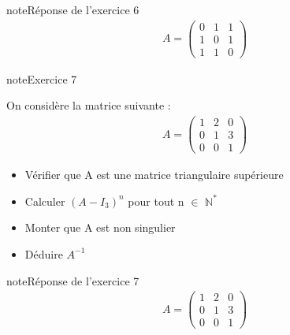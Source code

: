 \documentclass[letterpaper,10pt,french]{jupyterBook}
\begin{document}
\begin{sphinxadmonition}{note}{Réponse de l’exercice 6}
\begin{equation*}
\begin{split}
A = \begin{pmatrix}
0 & 1 & 1  \\
1 & 0 & 1  \\
1 & 1 & 0 
\end{pmatrix}
\end{split}
\end{equation*}\end{sphinxadmonition}

\begin{sphinxadmonition}{note}{Exercice 7}

\sphinxAtStartPar
On considère la matrice suivante :
\begin{equation*}
\begin{split}
A = \begin{pmatrix}
1 & 2 & 0 \\
0 & 1 & 3  \\
0 & 0 & 1 
\end{pmatrix}
\end{split}
\end{equation*}\begin{itemize}
\item {} 
\sphinxAtStartPar
Vérifier que A est une matrice triangulaire supérieure

\item {} 
\sphinxAtStartPar
Calculer \({(A-I_3)}^{n}\) pour tout n \(\in\) \(\mathbb{N}^{*}\)

\item {} 
\sphinxAtStartPar
Monter que A est non singulier

\item {} 
\sphinxAtStartPar
Déduire \(A^{-1}\)

\end{itemize}
\end{sphinxadmonition}

\begin{sphinxadmonition}{note}{Réponse de l’exercice 7}
\begin{equation*}
\begin{split}
A = \begin{pmatrix}
1 & 2 & 0 \\
0 & 1 & 3  \\
0 & 0 & 1 
\end{pmatrix}
\end{split}
\end{equation*}\end{sphinxadmonition}
\end{document}
